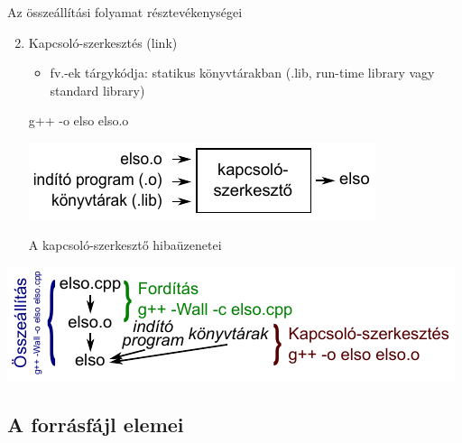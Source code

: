 \documentclass[usenames,dvipsnames,aspectratio=169]{beamer}
\begin{document}
\begin{frame}[fragile]
  Az összeállítási folyamat résztevékenységei
  \begin{enumerate}
    \setcounter{enumi}{1}
    \item Kapcsoló-szerkesztés (link)
    \begin{itemize}
      \item fv.-ek tárgykódja: statikus könyvtárakban (.lib, run-time library vagy standard library)
    \end{itemize}
    \begin{block}{}
      g++ -o elso elso.o
    \end{block}
    \begin{center}
      \includegraphics{kapcsszerk.pdf}
    \end{center}
    A kapcsoló-szerkesztő hibaüzenetei
  \end{enumerate}
\end{frame}

\begin{frame}
  \begin{center}
    \includegraphics[width=\textwidth]{folyamat.pdf}
  \end{center}
\end{frame}

\subsection{A forrásfájl elemei}

\begin{frame}
  \begin{exampleblock}{}
    \footnotesize
    
  \end{exampleblock}
\end{frame}
\end{document}
